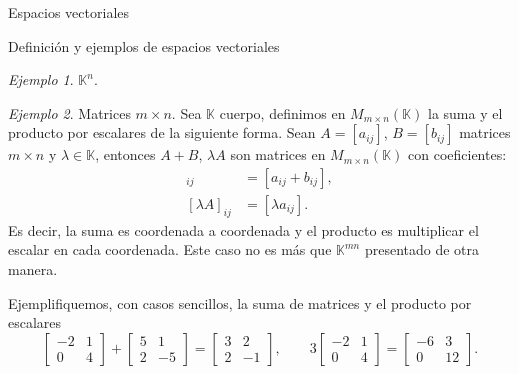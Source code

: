 \documentclass[a4paper,12pt,twoside,spanish,reqno]{amsbook}
\numberwithin{equation}{section}
\theoremstyle{definition}
\theoremstyle{remark}
\newtheorem*{ejemplo*}{Ejemplo}
\newcommand{\K}{\mathbb K}
\begin{document}
\begin{chapter}{Espacios vectoriales}
\begin{section}{Definición y ejemplos de espacios vectoriales}
\begin{ejemplo*} {\sc $\K^n$.}
                
            \end{ejemplo*}
            
            \medspace
            
            \begin{ejemplo*}{\sc Matrices $m \times n$.} Sea $\K$ cuerpo,  definimos en $M_{m \times n}(\K)$ la suma  y el producto por escalares de la siguiente forma. Sean $A = [a_{ij}]$, $B = [b_{ij}]$ matrices $m \times n$ y $ \lambda \in \K$, entonces $A+B$, $\lambda A$ son matrices en $M_{m \times n}(\K)$ con coeficientes:
                \begin{align*}
                [A + B]_{ij} &= [a_{ij} + b_{ij}], \\
                [\lambda A]_{ij} &= [\lambda a_{ij}]. 
                \end{align*}
                Es decir, la suma es coordenada a coordenada y el producto es multiplicar el escalar en cada coordenada. Este caso no es más que $\K^{mn}$ presentado de otra manera. 
                
                Ejemplifiquemos, con casos sencillos, la suma de matrices y el producto por escalares
                \begin{equation*}
                \begin{bmatrix} -2&1\\0&4 \end{bmatrix} + \begin{bmatrix} 5&1\\2&-5 \end{bmatrix} =
                \begin{bmatrix} 3&2\\2&-1 \end{bmatrix}, \qquad 
                3\begin{bmatrix} -2&1\\0&4 \end{bmatrix} = \begin{bmatrix} -6&3\\0&12 \end{bmatrix}.
                \end{equation*}	
            \end{ejemplo*}
            
            \medspace
            

\end{section}
\end{chapter}
\end{document}
